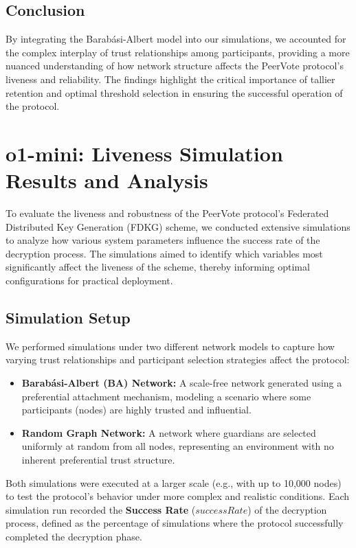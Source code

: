 \documentclass[runningheads]{llncs}
\begin{document}
\subsection{Conclusion}

By integrating the Barabási-Albert model into our simulations, we accounted for the complex interplay of trust relationships among participants, providing a more nuanced understanding of how network structure affects the PeerVote protocol's liveness and reliability. The findings highlight the critical importance of tallier retention and optimal threshold selection in ensuring the successful operation of the protocol.

\section{o1-mini: Liveness Simulation Results and Analysis}
\label{sec:extended-results}

To evaluate the liveness and robustness of the PeerVote protocol's Federated Distributed Key Generation (FDKG) scheme, we conducted extensive simulations to analyze how various system parameters influence the success rate of the decryption process. The simulations aimed to identify which variables most significantly affect the liveness of the scheme, thereby informing optimal configurations for practical deployment.

\subsection{Simulation Setup}

We performed simulations under two different network models to capture how varying trust relationships and participant selection strategies affect the protocol:

\begin{itemize}
    \item \textbf{Barabási-Albert (BA) Network:} 
    A scale-free network generated using a preferential attachment mechanism, modeling a scenario where some participants (nodes) are highly trusted and influential.
    
    \item \textbf{Random Graph Network:} 
    A network where guardians are selected uniformly at random from all nodes, representing an environment with no inherent preferential trust structure.
\end{itemize}

Both simulations were executed at a larger scale (e.g., with up to 10,000 nodes) to test the protocol’s behavior under more complex and realistic conditions. Each simulation run recorded the \textbf{Success Rate} ($successRate$) of the decryption process, defined as the percentage of simulations where the protocol successfully completed the decryption phase.
\end{document}
